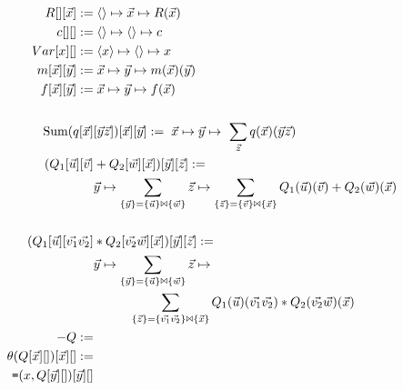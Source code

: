 \noindent{}
\begin{align*}
R[][\vec{x}]          := & \; \tuple{} \mapsto \vec{x} \mapsto R(\vec{x})\\
c[][]                 := & \; \tuple{} \mapsto \tuple{} \mapsto c\\
Var[x][]              := & \; \tuple{x} \mapsto \tuple{} \mapsto x\\
m[\vec{x}][\vec{y}]   := & \; \vec{x} \mapsto \vec{y} \mapsto
m(\vec{x})(\vec{y})
\\
\comment{
\theta[x,y][]         := & \; \tuple{x,y} \mapsto \tuple{} \mapsto
                           \begin{cases}
                           1 \ldots x \; \theta \; y \\
                           0 \ldots \mbox{otherwise.}
                           \end{cases}\\
\theta_c[x][]         := & \; \tuple{x} \mapsto \tuple{} \mapsto
                           \begin{cases}
                           1 \ldots x \; \theta \; c \\
                           0 \ldots \mbox{otherwise.}
                           \end{cases}\\
\calceq_\q[][y]       := & \; \tuple{} \mapsto \tuple{y} \mapsto
                              \q(\tuple{})(\tuple{})
\\
\calceq[x][y]         := & \; \tuple{x} \mapsto \tuple{y} \mapsto x
\\
}
f[\vec{x}][\vec{y}]   := & \; \vec{x} \mapsto \vec{y} \mapsto f(\vec{x})
\\ 
\\
\calcsum(\q[\vec{x}] & [\vec{y}\vec{z}])[\vec{x}][\vec{y}] := \;
\vec{x} \mapsto \vec{y} \mapsto \ \sum_{\vec{z}} \q(\vec{x})(\vec{y}\vec{z})
\\
(\qqa[\vec{u}][\vec{v}] & + \qqb[\vec{w}][\vec{x}])[\vec{y}][\vec{z}] :=  \\
& \vec{y} \mapsto \sum_{ \{\vec{y}\} = \{\vec{u}\} \Join \{\vec{w}\} }
\vec{z} \mapsto  \sum_{ \{\vec{z}\} = \{\vec{v}\} \Join \{\vec{x}\} }
\qqa(\vec{u})(\vec{v}) + \qqb(\vec{w})(\vec{x})
\\
\\
(\qqa[\vec{u}][\vec{v_1}\vec{v_2}] & * \qqb[\vec{v_2}\vec{w}][\vec{x}])
[\vec{y}][\vec{z}] :=  \\
& \vec{y} \mapsto \sum_{ \{\vec{y}\} = \{\vec{u}\} \Join \{\vec{w}\} }
\vec{z} \mapsto \\
& \qquad \;\;\;
\sum_{ \{\vec{z}\} = \{\vec{v_1}\vec{v_2}\} \Join \{\vec{x}\} }
\qqa(\vec{u})(\vec{v_1}\vec{v_2}) * \qqb(\vec{v_2}\vec{w})(\vec{x})
\\
-\qq :=
\\
\theta(\qq[\vec{x}][])[\vec{x}][] :=
\\
\calceq(x,\qq[\vec{y}][])[\vec{y}][] 
\end{align*}



